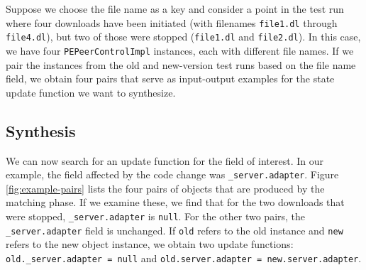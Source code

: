 Suppose we choose the file name as a key and consider a point in the
test run where four downloads have been initiated (with filenames
\texttt{file1.dl} through \texttt{file4.dl}), but two of those were
stopped (\texttt{file1.dl} and \texttt{file2.dl}).  In this case, we
have four \texttt{PEPeerControlImpl} instances, each with different
file names.  If we pair the instances from the old and new-version
test runs based on the file name field, we obtain four pairs that
serve as input-output examples for the state update function we want
to synthesize.

\subsection{Synthesis}

We can now search for an update function for the field of interest.
In our example, the field affected by the code change was
\texttt{\_server.adapter}.  Figure \ref{fig:example-pairs} lists the
four pairs of objects that are produced by the matching phase.  If we
examine these, we find that for the two downloads that were stopped,
\texttt{\_server.adapter} is \texttt{null}.  For the other two pairs,
the \texttt{\_server.adapter} field is unchanged.  If \texttt{old}
refers to the old instance and \texttt{new} refers to the new object
instance, we obtain two update functions: \texttt{old.\_server.adapter
  = null} and \texttt{old.server.adapter = new.server.adapter}.
